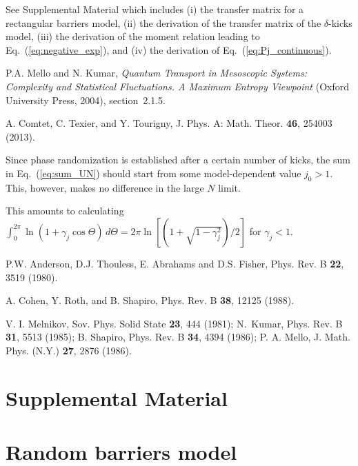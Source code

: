 \documentclass[ prl, twocolumn, superscriptaddress, amsfonts, amsmath,floatfix]{revtex4-1}
\begin{document}
\begin{thebibliography}{40}
See Supplemental Material which includes (i) the transfer matrix for a rectangular barriers model, (ii) the derivation of the transfer matrix of the $\delta$-kicks model, (iii) the derivation of the moment relation leading to Eq.~(\ref{eq:negative_exp}), and (iv) the derivation of Eq.~(\ref{eq:Pj_continuous}). 

{P.A. Mello and N. Kumar, {\it Quantum Transport in Mesoscopic Systems: Complexity and Statistical Fluctuations. A Maximum Entropy Viewpoint} (Oxford University Press, 2004), section~2.1.5.}

A. Comtet, C. Texier, and Y. Tourigny, J. Phys. A: Math. Theor. {\bf 46}, 254003 (2013).

Since phase randomization is established after a certain number of kicks, the sum in Eq.~(\ref{eq:sum_UN}) should start from some model-dependent value $j_0 > 1$. This, however, makes no difference in the large $N$ limit.

{This amounts to calculating
$\int_0^{2\pi} \ln(1+ \gamma_j \cos\Theta) \, d\Theta = 2\pi \ln  [ (1+\sqrt{1-\gamma_j^2} )/2 ]$
for $\gamma_j <1$.}

{P.W. Anderson, D.J. Thouless, E. Abrahams and D.S. Fisher, Phys. Rev. B {\bf 22}, 3519 (1980).}

A. Cohen, Y. Roth, and B. Shapiro, Phys. Rev. B {\bf 38}, 12125 (1988).

V. I. Melnikov,  Sov. Phys. Solid State {\bf 23}, 444 (1981);
N.~Kumar, Phys. Rev. B {\bf 31}, 5513 (1985);
B. Shapiro, Phys. Rev. B {\bf 34}, 4394 (1986);
P. A. Mello, J. Math. Phys. (N.Y.) {\bf 27}, 2876 (1986).

\end{thebibliography}

\newpage

\section*{Supplemental Material}

\section{Random barriers model}
\end{document}
